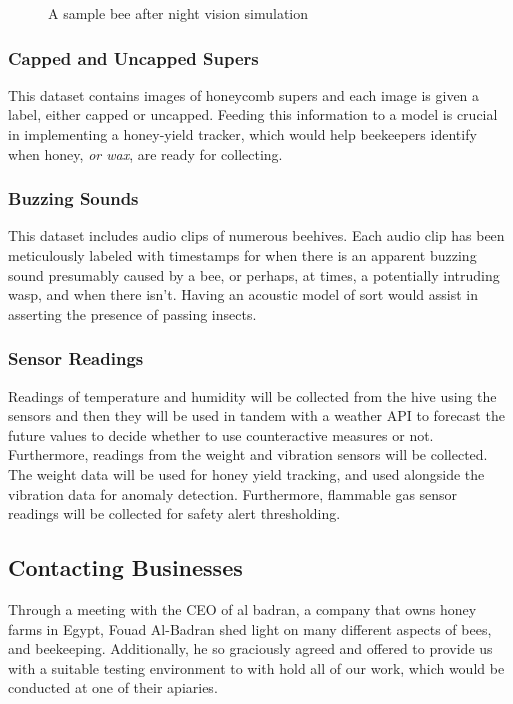 \documentclass[12pt]{article}
\begin{document}
\begin{figure}[H]
\begin{minipage}{0.45\textwidth}
			\caption{A sample bee after night vision simulation}
			\label{fig:DATA_NV}
		\end{minipage}
	\end{figure}
	
	
	\subsubsection{Capped and Uncapped Supers}
	This dataset contains images of honeycomb supers and each image is given a label, either capped or uncapped. Feeding this information to a model is crucial in implementing a honey-yield tracker, which would help beekeepers identify when honey, \textit{or wax}, are ready for collecting.
	
	\subsubsection{Buzzing Sounds}
	This dataset \cite{kaggle_to_bee_or_not_to_bee} includes audio clips of numerous beehives. Each audio clip has been meticulously labeled with timestamps for when there is an apparent buzzing sound presumably caused by a bee, or perhaps, at times, a potentially intruding wasp, and when there isn't. Having an acoustic model of sort would assist in asserting the presence of passing insects.
	
	
	\subsubsection{Sensor Readings}
	Readings of temperature and humidity will be collected from the hive using the sensors and then they will be used in tandem with a weather API to forecast the future values to decide whether to use counteractive measures or not. Furthermore, readings from the weight and vibration sensors will be collected. The weight data will be used for honey yield tracking, and used alongside the vibration data for anomaly detection. Furthermore, flammable gas sensor readings will be collected for safety alert thresholding.
	
	\subsection{Contacting Businesses}
	Through a meeting with the CEO of al badran, a company that owns honey farms in Egypt, Fouad Al-Badran shed light on many different aspects of bees, and beekeeping. Additionally, he so graciously agreed and offered to provide us with a suitable testing environment to with hold all of our work, which would be conducted at one of their apiaries.
	
	\printbibliography
\end{document}
